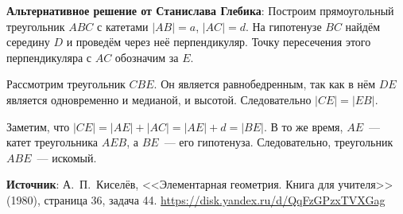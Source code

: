 \documentclass{article} %
\begin{document}
\clearpage

\textbf{Альтернативное решение от Станислава Глебика}: Построим прямоугольный треугольник $ABC$ с катетами $|AB|=a$, $|AC|=d$.
На гипотенузе $BC$ найдём середину $D$ и проведём через неё перпендикуляр. Точку пересечения этого перпендикуляра с $AC$ обозначим за $E$.

Рассмотрим треугольник $CBE$. Он является равнобедренным, так как в нём $DE$ является одновременно и медианой, и высотой. Следовательно $|CE| = |EB|$.

Заметим, что $|CE| = |AE| + |AC| = |AE| + d = |BE|$. В то же время, $AE$~--- катет треугольника $AEB$, а $BE$~--- его гипотенуза. Следовательно, треугольник $ABE$~--- искомый. 

\begin{center}
\end{center}

\textbf{Источник}: А.~П.~Киселёв, <<Элементарная геометрия. Книга для учителя>> (1980), страница 36, задача 44. \url{https://disk.yandex.ru/d/QqFzGPzxTVXGag}
\end{document}
